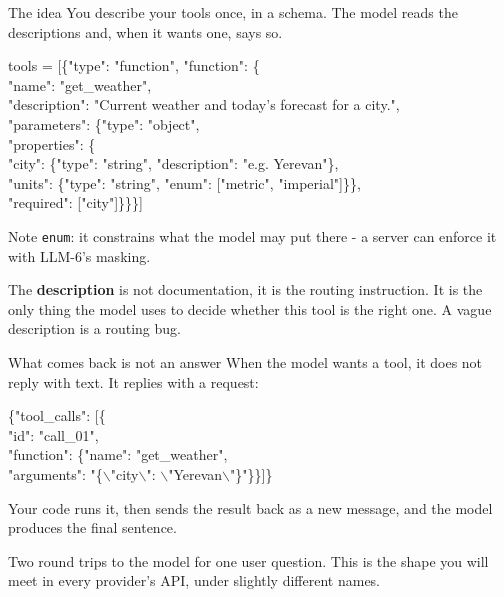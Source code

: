 \documentclass[aspectratio=169]{beamer}
\newcommand{\keybox}[1]{%
  \begin{tcolorbox}[colback=armblue!8, colframe=armblue, boxrule=0.6pt, arc=2pt]
  #1
  \end{tcolorbox}}
\newcommand{\watchbox}[1]{%
  \begin{tcolorbox}[colback=armorange!12, colframe=armorange, boxrule=0.6pt, arc=2pt]
  #1
  \end{tcolorbox}}
\newcommand{\codebox}[1]{%
  \begin{center}
  \begin{tcolorbox}[colback=lightbg, colframe=gray, boxrule=0.5pt, arc=2pt,
                    width=0.94\textwidth, left=4pt, right=4pt, top=3pt, bottom=3pt]
    \ttfamily\scriptsize #1
  \end{tcolorbox}
  \end{center}}
\begin{document}
\begin{frame}{The idea}
  \vspace{0.25em}
  You describe your tools once, in a schema. The model reads the descriptions and, when it
  wants one, says so.

  \codebox{tools = [\{"type": "function", "function": \{\\
  \hspace*{1em}"name": "get\_weather",\\
  \hspace*{1em}"description": "Current weather and today's forecast for a city.",\\
  \hspace*{1em}"parameters": \{"type": "object",\\
  \hspace*{2em}"properties": \{\\
  \hspace*{3em}"city":  \{"type": "string", "description": "e.g. Yerevan"\},\\
  \hspace*{3em}"units": \{"type": "string", "enum": ["metric", "imperial"]\}\},\\
  \hspace*{2em}"required": ["city"]\}\}\}]}

  \vspace{-0.2em}
  {\footnotesize Note \texttt{enum}: it constrains what the model may put there - a server can
  enforce it with LLM-6's masking.}

  \vspace{0.2em}
  \watchbox{The \textbf{description} is not documentation, it is the routing instruction. It is
  the only thing the model uses to decide whether this tool is the right one. A vague
  description is a routing bug.}
\end{frame}

\begin{frame}{What comes back is not an answer}
  \vspace{0.7em}
  When the model wants a tool, it does not reply with text. It replies with a request:

  \codebox{\{"tool\_calls": [\{\\
  \hspace*{1em}"id": "call\_01",\\
  \hspace*{1em}"function": \{"name": "get\_weather",\\
  \hspace*{2em}\qquad\qquad "arguments": "\{$\backslash$"city$\backslash$": $\backslash$"Yerevan$\backslash$"\}"\}\}]\}}

  \vspace{0.5em}
  Your code runs it, then sends the result back as a new message, and the model produces the
  final sentence.

  \vspace{0.7em}
  \keybox{Two round trips to the model for one user question. This is the shape you will meet
  in every provider's API, under slightly different names.}
\end{frame}
\end{document}
